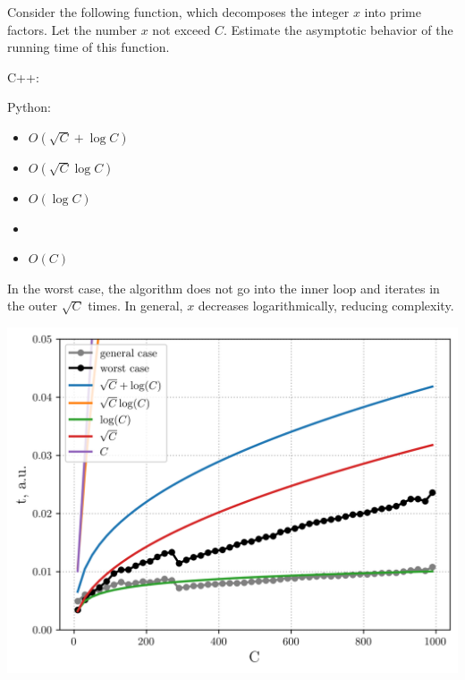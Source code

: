 \documentclass[a4paper]{article}
\begin{document}
Consider the following function, which decomposes the integer $x$ into prime factors. Let the number $x$ not exceed $C$. Estimate the asymptotic behavior of the running time of this function.

\SPACE

\noindent C++:



\SPACE

\noindent Python:



\SPACE

\LINE

\SPACE

\begin{itemize}
\item $O(\sqrt{C} + \log C)$
\item $O(\sqrt{C} \log C)$
\item $O(\log C)$
\item {}
\item $O(C)$
\end{itemize}

\SPACE

\newpage

In the worst case, the algorithm does not go into the inner loop and iterates in the outer $\sqrt{C}$ times. In general, $x$ decreases logarithmically, reducing complexity.

\begin{center}
\includegraphics[width=15cm]{06.png}
\end{center}
\end{document}
